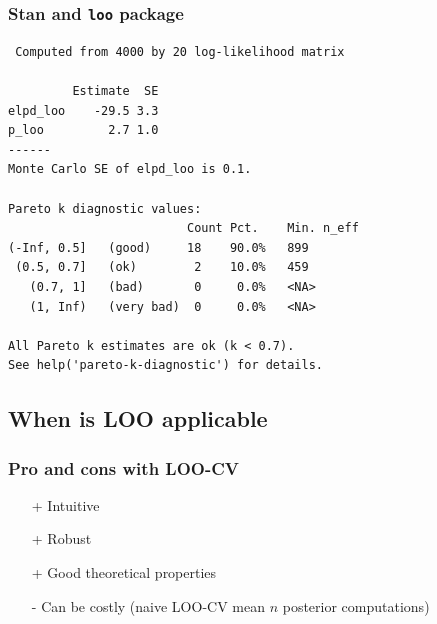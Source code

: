 \documentclass[10pt]{beamer}
\begin{document}
\begin{frame}[fragile]

\frametitle{Stan and {\tt loo} package}

  {\scriptsize
\begin{lstlisting}
 Computed from 4000 by 20 log-likelihood matrix

         Estimate  SE
elpd_loo    -29.5 3.3
p_loo         2.7 1.0
------
Monte Carlo SE of elpd_loo is 0.1.

Pareto k diagnostic values:
                         Count Pct.    Min. n_eff
(-Inf, 0.5]   (good)     18    90.0%   899
 (0.5, 0.7]   (ok)        2    10.0%   459
   (0.7, 1]   (bad)       0     0.0%   <NA>
   (1, Inf)   (very bad)  0     0.0%   <NA>

All Pareto k estimates are ok (k < 0.7).
See help('pareto-k-diagnostic') for details.
\end{lstlisting}
}

\end{frame}


\subsection{When is LOO applicable}
\frame{\subsectionpage}

\begin{frame}

\frametitle{Pro and cons with LOO-CV}

  \begin{enumerate}
  \item[+] Intuitive
  \item[+] Robust
  \item[+] Good theoretical properties
  \pause
  \item[-] Can be costly (naive LOO-CV mean $n$ posterior computations)
  \end{enumerate}

\end{frame}
\end{document}
